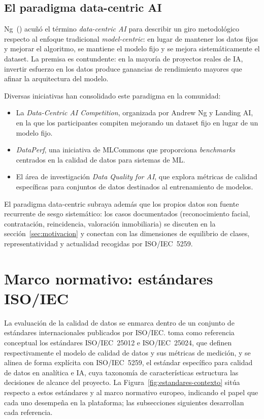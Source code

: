 \subsection{El paradigma data-centric AI}

Ng~(\citeyear{ng2021datacentric}) acuñó el término \emph{data-centric AI}
para describir un giro metodológico respecto al enfoque tradicional
\emph{model-centric}: en lugar de mantener los datos fijos y mejorar el
algoritmo, se mantiene el modelo fijo y se mejora sistemáticamente el dataset.
La premisa es contundente: en la mayoría de proyectos reales de \ac{IA},
invertir esfuerzo en los datos produce ganancias de rendimiento mayores que
afinar la arquitectura del modelo.

Diversas iniciativas han consolidado este paradigma en la comunidad:

\begin{itemize}
  \item La \emph{Data-Centric AI Competition}, organizada por Andrew Ng y
    Landing AI, en la que los participantes compiten mejorando un dataset fijo
    en lugar de un modelo fijo.
  \item \emph{DataPerf}, una iniciativa de MLCommons que proporciona
    \emph{benchmarks} centrados en la calidad de datos para sistemas de
    \ac{ML}.
  \item El área de investigación \emph{Data Quality for AI}, que explora
    métricas de calidad específicas para conjuntos de datos destinados al
    entrenamiento de modelos.
\end{itemize}

El paradigma data-centric subraya además que los propios datos son
fuente recurrente de sesgo sistemático: los casos documentados
(reconocimiento facial, contratación, reincidencia, valoración
inmobiliaria) se discuten en la sección~\ref{sec:motivacion} y conectan
con las dimensiones de equilibrio de clases, representatividad y
actualidad recogidas por \ac{ISO}/\ac{IEC}~5259.


\section{Marco normativo: estándares \ac{ISO}/\ac{IEC}}
\label{sec:marco-normativo}

La evaluación de la calidad de datos se enmarca dentro de un conjunto de
estándares internacionales publicados por \ac{ISO}/\ac{IEC}. \dataqual toma como
referencia conceptual los estándares \ac{ISO}/\ac{IEC}~25012 e
\ac{ISO}/\ac{IEC}~25024, que definen respectivamente el modelo de calidad de datos
y sus métricas de medición, y se alinea de forma explícita con
\ac{ISO}/\ac{IEC}~5259, el estándar específico para calidad de datos en analítica
e \ac{IA}, cuya taxonomía de características estructura las decisiones de
alcance del proyecto.  La Figura~\ref{fig:estandares-contexto} sitúa
\dataqual respecto a estos estándares y al marco normativo europeo, indicando
el papel que cada uno desempeña en la plataforma; las subsecciones siguientes
desarrollan cada referencia.

